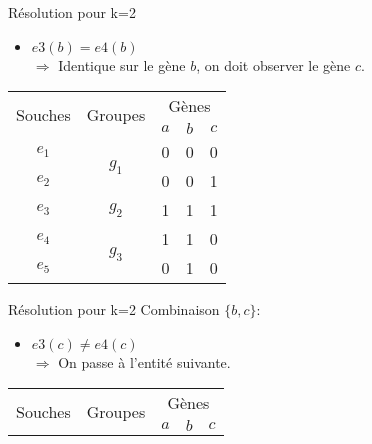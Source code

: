 \begin{overprint}
{\begin{minipage}[r]{0.46\linewidth}
\begin{block}{Résolution pour k=2}
\begin{itemize}
						\item $e3(b) = e4(b) $ \\ $\Rightarrow$ Identique sur le gène $b$, on doit observer le gène $c$.
					\end{itemize}
				\end{block}
			\end{minipage}
		}
		{
			\begin{minipage}[l]{0.46\linewidth}
				\begin{center}
					\begin{tabular}{|c||c|c|c|c|}
						\hline
						\multirow{2}{*}{Souches}&\multirow{2}{*}{Groupes}&\multicolumn{3}{c|}{Gènes
						}\\
						&&$a$&\cellcolor{blue!75}$b$&\cellcolor{blue!75}$c$\\
						\hline
						\hline
						$e_1$&\multirow{2}{*}{$g_1$}& 0 & 0 & 0\\
						\cline{1-1} \cline{3-5}
						$e_2$&& 0 & 0 & 1\\
						\hline
						\hline
						$e_3$&$g_2$& 1 & 1 & \cellcolor{cyan}1\\
						\hline
						\hline
						$e_4$&\multirow{2}{*}{$g_3$}& 1 & 1 & \cellcolor{cyan}0\\
						\cline{1-1} \cline{3-5}
						$e_5$&& 0 & 1 & 0\\
						\hline
					\end{tabular}
				\end{center}
			\end{minipage}
			\hspace{0.6cm}
			\begin{minipage}[r]{0.46\linewidth}
				\begin{block}{Résolution pour k=2}
					Combinaison $\{b,c\}$:
					\begin{itemize}
						\item $e3(c) \not = e4(c) $ \\ $\Rightarrow$ On passe à l'entité suivante.
					\end{itemize}
				\end{block}
			\end{minipage}
		}
		\only<29>
		{
			\begin{minipage}[l]{0.46\linewidth}
				\begin{center}
					\begin{tabular}{|c||c|c|c|c|}
						\hline
						\multirow{2}{*}{Souches}&\multirow{2}{*}{Groupes}&\multicolumn{3}{c|}{Gènes
						}\\
						&&$a$&\cellcolor{blue!75}$b$&\cellcolor{blue!75}$c$\\

\end{tabular}
\end{center}
\end{minipage}}
\end{overprint}
